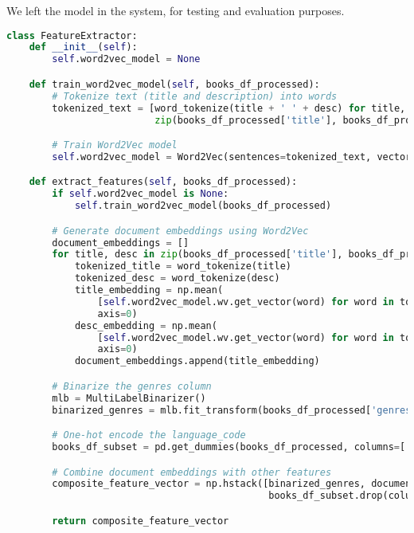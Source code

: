 We left the model in the system, for testing and evaluation purposes.

\begin{lstlisting}[language=Python, caption={Feature Extraction using traditional Word2Vec}, label={lst:example}, linewidth=\linewidth, breaklines=true]
    class FeatureExtractor:
    def __init__(self):
        self.word2vec_model = None

    def train_word2vec_model(self, books_df_processed):
        # Tokenize text (title and description) into words
        tokenized_text = [word_tokenize(title + ' ' + desc) for title, desc in
                          zip(books_df_processed['title'], books_df_processed['description'])]

        # Train Word2Vec model
        self.word2vec_model = Word2Vec(sentences=tokenized_text, vector_size=100, window=5, min_count=1, workers=4)

    def extract_features(self, books_df_processed):
        if self.word2vec_model is None:
            self.train_word2vec_model(books_df_processed)

        # Generate document embeddings using Word2Vec
        document_embeddings = []
        for title, desc in zip(books_df_processed['title'], books_df_processed['description']):
            tokenized_title = word_tokenize(title)
            tokenized_desc = word_tokenize(desc)
            title_embedding = np.mean(
                [self.word2vec_model.wv.get_vector(word) for word in tokenized_title if word in self.word2vec_model.wv],
                axis=0)
            desc_embedding = np.mean(
                [self.word2vec_model.wv.get_vector(word) for word in tokenized_desc if word in self.word2vec_model.wv],
                axis=0)
            document_embeddings.append(title_embedding)

        # Binarize the genres column
        mlb = MultiLabelBinarizer()
        binarized_genres = mlb.fit_transform(books_df_processed['genres'])

        # One-hot encode the language_code
        books_df_subset = pd.get_dummies(books_df_processed, columns=['language_code'])

        # Combine document embeddings with other features
        composite_feature_vector = np.hstack([binarized_genres, document_embeddings,
                                              books_df_subset.drop(columns=['genres', 'title', 'description']).values])

        return composite_feature_vector
\end{lstlisting}
